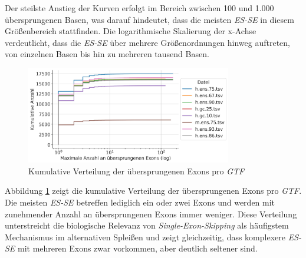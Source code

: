 \documentclass[12pt]{article}
\begin{document}
Der steilste Anstieg der Kurven erfolgt im Bereich zwischen 100 und 1.000 übersprungenen Basen, was darauf hindeutet,
dass die meisten \textit{ES-SE} in diesem Größenbereich stattfinden.
Die logarithmische Skalierung der x-Achse verdeutlicht, dass die \textit{ES-SE} über mehrere Größenordnungen hinweg auftreten,
von einzelnen Basen bis hin zu mehreren tausend Basen.

\begin{figure}[htpb]
	\centering
	\includegraphics[width=0.8\textwidth]{./plots/skipped_exons.jpg}
	\caption{Kumulative Verteilung der übersprungenen Exons pro \textit{GTF}}
	\label{fig:-plots-skipped_exons-jpg}
\end{figure}

Abbildung \ref{fig:-plots-skipped_exons-jpg} zeigt die kumulative Verteilung der übersprungenen Exons pro \textit{GTF}.
Die meisten \textit{ES-SE} betreffen lediglich ein oder zwei Exons und werden mit zunehmender Anzahl an
übersprungenen Exons immer weniger.
Diese Verteilung unterstreicht die biologische Relevanz von \textit{Single-Exon-Skipping} als häufigstem Mechanismus im alternativen
Spleißen und zeigt gleichzeitig, dass komplexere \textit{ES-SE} mit mehreren Exons zwar vorkommen,
aber deutlich seltener sind.
\end{document}
